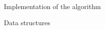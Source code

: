 \documentclass[9pt]{extarticle}
\begin{document}
    \begin{section}{Implementation of the algorithm}

        \begin{subsection}{Data structures}


            

\end{subsection}
\end{section}
\end{document}
